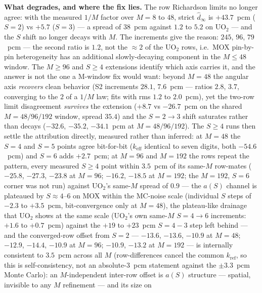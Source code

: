 \documentclass[11pt,a4paper]{article}
\begin{document}
\textbf{What degrades, and where the fix lies.} The row Richardson
limits no longer agree: with the measured $1/M$ factor over
$M=8$ to $48$, strict $\hat d_\infty$ is $+43.7$~pcm ($S{=}2$) vs
$+5.7$ ($S{=}3$) --- a spread of $38$~pcm against $1.2$ to $5.2$ on
UO$_2$ --- and the $S$ shift no longer decays with $M$.  The
increments give the reason: $245$, $96$, $79$~pcm --- the second
ratio is $1.2$, not the $\approx 2$ of the UO$_2$ rows, i.e.\ MOX
pin-by-pin heterogeneity has an additional slowly-decaying component
in the $M\le48$ window.  The $M\ge96$ and $S\ge4$ extensions identify
which axis carries it, and the answer is not the one a M-window fix
would want: beyond $M{=}48$ the angular axis \emph{recovers} clean
behavior (S2 increments $28.1$, $7.6$~pcm --- ratios $2.8$, $3.7$,
converging to the $2$ of a $1/M$ law; fits with rms $1.2$ to
$2.0$~pcm), yet the two-row limit disagreement \emph{survives} the
extension ($+8.7$ vs $-26.7$~pcm on the shared $M=48/96/192$ window,
spread $35.4$) and the $S{=}2{\to}3$ shift saturates rather than
decays ($-32.6$, $-35.2$, $-34.1$~pcm at $M=48/96/192$).  The
$S\ge4$ runs then settle the attribution directly, measured rather
than inferred: at $M{=}48$ the $S{=}4$ and $S{=}5$ points agree
bit-for-bit ($k_\mathrm{eff}$ identical to seven digits, both
$-54.6$~pcm) and $S{=}6$ adds $+2.7$~pcm; at $M{=}96$ and
$M{=}192$ the rows repeat the pattern, every measured $S{\ge}4$
point within $3.5$~pcm of its same-$M$ row-mates ($-25.8$, $-27.3$,
$-23.8$ at $M{=}96$; $-16.2$, $-18.5$ at $M{=}192$; the
$M{=}192$, $S{=}6$ corner was not run) against UO$_2$'s same-$M$
spread of $0.9$ --- the $a(S)$ channel is plateaued by
$S{\approx}4$--$6$ on MOX within the MC-noise scale (individual
$S$ steps of $-2.3$ to $+3.5$~pcm, bit-convergence only at
$M{=}48$), the plateau-like drainage that UO$_2$ shows at the same
scale (UO$_2$'s own same-$M$ $S{=}4\to6$ increments: $+1.6$ to
$+0.7$~pcm) against the $+19$ to $+23$~pcm $S{=}4{-}3$ step left
behind ---
and the converged-row offset from $S{=}2$ ---
$-13.6$, $-13.6$, $-10.9$ at $M{=}48$; $-12.9$, $-14.4$, $-10.9$
at $M{=}96$; $-10.9$, $-13.2$ at $M{=}192$ --- is internally
consistent to $3.5$~pcm across all $M$ (row-differences cancel the
common $k_\mathrm{ref}$, so this is self-consistency, not an
absolute-$3$~pcm statement against the $\pm3.3$~pcm Monte Carlo):
an $M$-independent inter-row offset is $a(S)$ structure
--- spatial, invisible to any $M$ refinement --- and its size on
\end{document}

